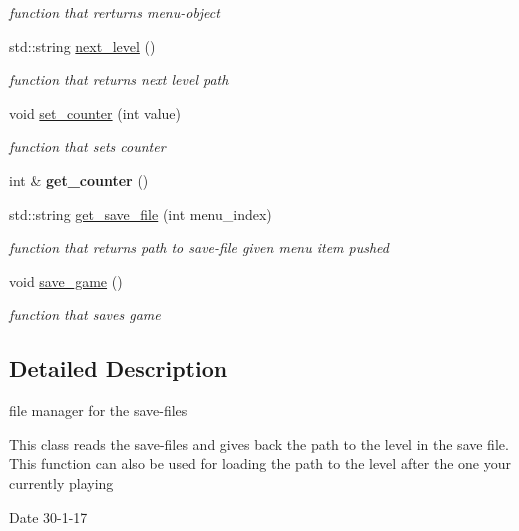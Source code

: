 \begin{DoxyCompactItemize}
\begin{DoxyCompactList}\small\item\em function that rerturns menu-\/object \end{DoxyCompactList}\item 
std\+::string \hyperlink{classfile__management_a75689c420580c71f0621dfbcc4c2a06f}{next\+\_\+level} ()
\begin{DoxyCompactList}\small\item\em function that returns next level path \end{DoxyCompactList}\item 
void \hyperlink{classfile__management_a291475384add5bdb8002127c71c568ac}{set\+\_\+counter} (int value)
\begin{DoxyCompactList}\small\item\em function that sets counter \end{DoxyCompactList}\item 
\mbox{\label{classfile__management_ae6291547fab57a5b861c52e970175854}} 
int \& {\bfseries get\+\_\+counter} ()
\item 
std\+::string \hyperlink{classfile__management_a92ece2d05964c828dcb9bf6c59043327}{get\+\_\+save\+\_\+file} (int menu\+\_\+index)
\begin{DoxyCompactList}\small\item\em function that returns path to save-\/file given menu item pushed \end{DoxyCompactList}\item 
void \hyperlink{classfile__management_a79e6ae7cec63aa959d7d0730d6ffa5a3}{save\+\_\+game} ()
\begin{DoxyCompactList}\small\item\em function that saves game \end{DoxyCompactList}\end{DoxyCompactItemize}


\subsection{Detailed Description}
file manager for the save-\/files 

This class reads the save-\/files and gives back the path to the level in the save file. This function can also be used for loading the path to the level after the one your currently playing

\begin{DoxyDate}{Date}
30-\/1-\/17 
\end{DoxyDate}


